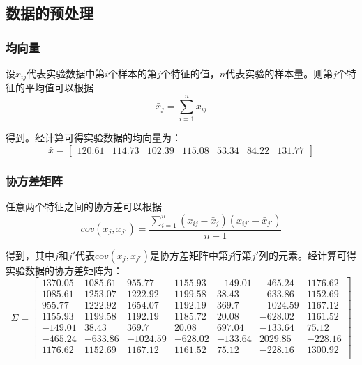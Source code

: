 \documentclass[UTF8]{ctexart}
\begin{document}
	\subsection{数据的预处理}
	
	\subsubsection{均向量}
	设$x_{ij}$代表实验数据中第$i$个样本的第$j$个特征的值，$n$代表实验的样本量。则第$j$个特征的平均值可以根据
	\begin{equation*}
	\bar{x}_j = \sum_{i=1}^{n}x_{ij}
	\end{equation*}
	
	得到。经计算可得实验数据的均向量为：
	\begin{equation*}
	\bar{x} = 
	\begin{bmatrix}
	120.61 &114.73& 102.39 &115.08  &53.34  &84.22 &131.77
	\end{bmatrix}
	\end{equation*}

	\subsubsection{协方差矩阵}
	
	任意两个特征之间的协方差可以根据
	\begin{equation*}
	cov(x_j, x_{j'}) = \frac{\sum_{i=1}^{n} (x_{ij} - \bar{x}_j)(x_{ij'} - \bar{x}_{j'})}{n-1}
	\end{equation*}
	
	得到，其中$j$和$j'$代表$cov(x_j, x_{j'})$是协方差矩阵中第$j$行第$j'$列的元素。经计算可得实验数据的协方差矩阵为：
	\begin{equation*}
	\Sigma = 
	\begin{bmatrix}
	1370.05 & 1085.61  & 955.77 & 1155.93 & -149.01 & -465.24 & 1176.62 \\
	1085.61 & 1253.07 & 1222.92 & 1199.58  &  38.43 & -633.86 & 1152.69 \\
	955.77 & 1222.92 & 1654.07 & 1192.19 &  369.7 & -1024.59 & 1167.12 \\
	1155.93 & 1199.58 & 1192.19 & 1185.72  &  20.08 & -628.02 & 1161.52 \\
	-149.01  &  38.43 &  369.7  &   20.08 &  697.04 & -133.64  &  75.12 \\
	-465.24 & -633.86 & -1024.59 & -628.02 & -133.64 & 2029.85 & -228.16 \\ 
	1176.62 & 1152.69 & 1167.12 & 1161.52  &  75.12 & -228.16 & 1300.92 \\
	\end{bmatrix}
	\end{equation*}
	
\end{document}
